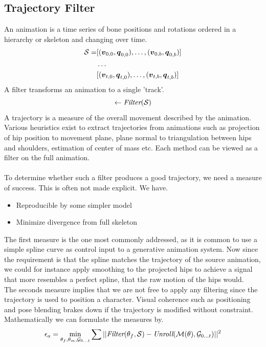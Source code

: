 \subsection{Trajectory Filter}
An animation is a time series of bone positions and rotations ordered in a hierarchy or skeleton and changing over time.  
\begin{subequations}
\begin{align}    
    \mathcal{S}=&[(\boldsymbol{v }_{0,0},\boldsymbol{q }_{0,0}), \dots, (\boldsymbol{v }_{0,b},\boldsymbol{q }_{0,b})]\\
        &\dots \\
            &[(\boldsymbol{v }_{t,0},\boldsymbol{q }_{t,0}), \dots, (\boldsymbol{v }_{t,b},\boldsymbol{q }_{t,b})]
\end{align}    
\end{subequations}
A filter transforms an animation to a single 'track'. 
\begin{equation}
    [\vec{v}_0,\quat{q}_0 \dots \vec{v}_t,\quat{q}_t] \leftarrow \ffunc(\skeleton)
\end{equation}
A trajectory is a measure of the overall movement described by the animation. Various heuristics exist to extract trajectories from animations such as projection of hip position to movement plane, plane normal to triangulation between hips and shoulders, estimation of center of mass etc. Each method can be viewed as a filter on the full animation.\\\\
To determine whether such a filter produces a good trajectory, we need a measure of success. This is often not made explicit. We have.
\begin{itemize}
    \item Reproducible by some simpler model
    \item Minimize divergence from full skeleton 
\end{itemize}
The first measure is the one most commonly addressed, as it is common to use a simple spline curve as control input to a generative animation system. Now since the requirement is that the spline matches the trajectory of the source animation, we could for instance apply smoothing to the projected hips to achieve a signal that more resembles a perfect spline, that the raw motion of the hips would.\\
The seconds measure implies that we are not free to apply any filtering since the trajectory is used to position a character. Visual coherence such as positioning and pose blending brakes down if the trajectory is modified without constraint.\\
Mathematically we can formulate the measures by.
\begin{equation}
    \epsilon_a=\min_{\theta_f,\theta_m,{\mathcal{G}_{0\dots{t}}}}\sum{|| \textit{Filter} (\theta_f,\mathcal{S})- \textit{Unroll} ( \mathcal{M} (\theta), \mathcal{G} _{0\dots{t}})||^2 }
\end{equation}



